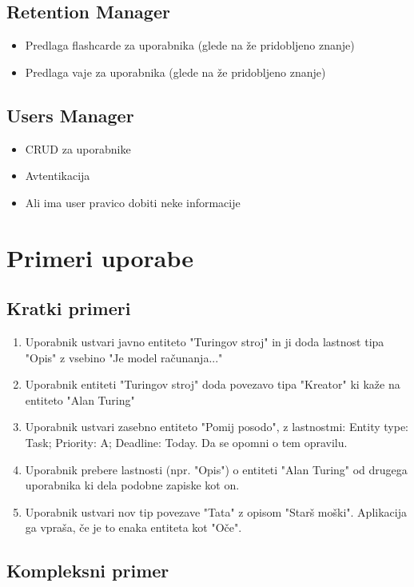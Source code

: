 \documentclass{article}
\begin{document}
\subsection{Retention Manager}
\begin{itemize}
    \item Predlaga flashcarde za uporabnika (glede na že pridobljeno znanje)
    \item Predlaga vaje za uporabnika (glede na že pridobljeno znanje)
\end{itemize}

\subsection{Users Manager}
\begin{itemize}
    \item CRUD za uporabnike
    \item Avtentikacija
    \item Ali ima user pravico dobiti neke informacije
\end{itemize}

\section{Primeri uporabe}

\subsection{Kratki primeri}
\begin{enumerate}
    \item Uporabnik ustvari javno entiteto "Turingov stroj" in ji doda lastnost tipa "Opis" z vsebino "Je model računanja..."
    \item Uporabnik entiteti "Turingov stroj" doda povezavo tipa "Kreator" ki kaže na entiteto "Alan Turing"
    \item Uporabnik ustvari zasebno entiteto "Pomij posodo", z lastnostmi: Entity type: Task; Priority: A; Deadline: Today. Da se opomni o tem opravilu.
    \item Uporabnik prebere lastnosti (npr. "Opis") o entiteti "Alan Turing" od drugega uporabnika ki dela podobne zapiske kot on. 
    \item Uporabnik ustvari nov tip povezave "Tata" z opisom "Starš moški". Aplikacija ga vpraša, če je to enaka entiteta kot "Oče".
\end{enumerate}

\subsection{Kompleksni primer}
\end{document}

